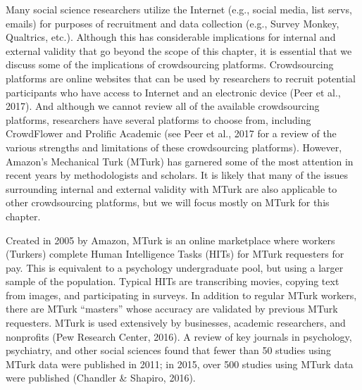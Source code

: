 \documentclass[
  11pt,
]{book}
\begin{document}
Many social science researchers utilize the Internet (e.g., social media, list servs, emails) for purposes of recruitment and data collection (e.g., Survey Monkey, Qualtrics, etc.). Although this has considerable implications for internal and external validity that go beyond the scope of this chapter, it is essential that we discuss some of the implications of crowdsourcing platforms. Crowdsourcing platforms are online websites that can be used by researchers to recruit potential participants who have access to Internet and an electronic device (Peer et al., 2017). And although we cannot review all of the available crowdsourcing platforms, researchers have several platforms to choose from, including CrowdFlower and Prolific Academic (see Peer et al., 2017 for a review of the various strengths and limitations of these crowdsourcing platforms). However, Amazon's Mechanical Turk (MTurk) has garnered some of the most attention in recent years by methodologists and scholars. It is likely that many of the issues surrounding internal and external validity with MTurk are also applicable to other crowdsourcing platforms, but we will focus mostly on MTurk for this chapter.

Created in 2005 by Amazon, MTurk is an online marketplace where workers (Turkers) complete Human Intelligence Tasks (HITs) for MTurk requesters for pay. This is equivalent to a psychology undergraduate pool, but using a larger sample of the population. Typical HITs are transcribing movies, copying text from images, and participating in surveys. In addition to regular MTurk workers, there are MTurk ``masters'' whose accuracy are validated by previous MTurk requesters. MTurk is used extensively by businesses, academic researchers, and nonprofits (Pew Research Center, 2016). A review of key journals in psychology, psychiatry, and other social sciences found that fewer than 50 studies using MTurk data were published in 2011; in 2015, over 500 studies using MTurk data were published (Chandler \& Shapiro, 2016).
\end{document}
